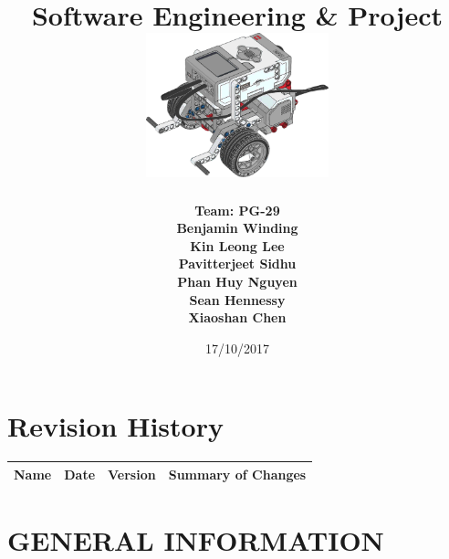 \documentclass[10pt,a4paper,titlepage]{article}
\begin{document}
	
	\begin{titlepage}
		
		\title{
			\fontsize{50}{12}\\
			\vspace{20pt}
			\fontsize{20}{12}\\
			\vspace{10pt}
			\large{Software Engineering \& Project} \\
			\vspace{20pt}
			\includegraphics[width=200px]{title-page-ev3.png}					
		}
		\date{17/10/2017}
		\author{
			\bf{Team: PG-29} \\
			Benjamin Winding \\
			Kin Leong Lee \\
			Pavitterjeet Sidhu \\
			Phan Huy Nguyen \\
			Sean Hennessy \\
			Xiaoshan Chen \\
		}
		\maketitle
		
	\end{titlepage}
		 
	\tableofcontents	
	
	
	
	\section*{Revision History}	
	\label{revtable}	
	\begin{tabular}{|p{2.1cm}|p{2.5cm}|p{2cm}|p{4.1cm}|}		
		\hline 
		\textbf {Name} & \textbf{Date} & \textbf {Version} &\textbf {Summary of Changes} \\ 
		\hline 
		\hline 		
	\end{tabular}

	\newpage
	
	\section{GENERAL INFORMATION}
\end{document}
